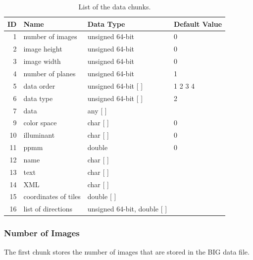 \documentclass{article}
\begin{document}
\begin{table}
\caption{\label{tab:chunks}List of the data chunks.}
\begin{center}
\begin{tabular}{rlll}
ID & Name & Data Type & Default Value \\
\hline
 1 & number of images & unsigned 64-bit & 0\\
 2 & image height & unsigned 64-bit & 0\\
 3 & image width & unsigned 64-bit & 0\\
 4 & number of planes & unsigned 64-bit & 1\\

 5 & data order & unsigned 64-bit [ ] & 1 2 3 4\\

 6 & data type & unsigned 64-bit [ ] & 2\\

 7 & data & any [ ] & \\

 9 & color space & char [ ] & 0 \\
10 & illuminant & char [ ] & 0 \\

11 & ppmm & double & 0 \\

12 & name & char [ ] & \\
13 & text & char [ ] & \\
14 & XML & char [ ] & \\
15 & coordinates of tiles & double [ ] & \\
16 & list of directions & unsigned 64-bit, double [ ] & \\
\end{tabular}
\end{center}
\end{table}

\subsubsection{Number of Images}
The first chunk stores the number of images that are stored in the BIG data file.

%
\end{document}

